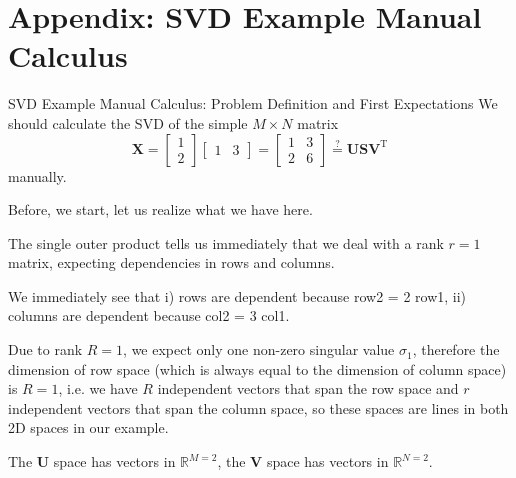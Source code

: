 \documentclass[mathserif, aspectratio=1610]{intbeamer}
\begin{document}
\section{Appendix: SVD Example Manual Calculus}
\begin{frame}[t]{SVD Example Manual Calculus: Problem Definition and First Expectations}
We should calculate the SVD of the simple $M \times N$ matrix
$$\bm{X} =
\begin{bmatrix}
1\\2
\end{bmatrix}
\begin{bmatrix}
1 & 3
\end{bmatrix}
=
\begin{bmatrix}
1 & 3\\
2 & 6
\end{bmatrix}
\stackrel{?}{=}
\bm{U}\bm{S}\bm{V}^\mathrm{T}
$$
manually.

Before, we start, let us realize what we have here.

The single outer product tells us immediately that we deal with a rank $r=1$ matrix, expecting dependencies
in rows and columns.

We immediately see that i) rows are dependent because row2 = 2 row1, ii) columns are dependent because col2 = 3 col1.

Due to rank $R=1$, we expect only one non-zero singular value $\sigma_1$, therefore the dimension
of row space (which is always equal to the dimension of column space) is $R=1$, i.e. we have $R$
independent vectors that span the row space and $r$ independent vectors that span the column space, so these spaces are lines in both 2D spaces in our example.

The $\bm{U}$ space has vectors in $\mathbb{R}^{M=2}$, the $\bm{V}$ space has vectors in $\mathbb{R}^{N=2}$.

\end{frame}
\end{document}
